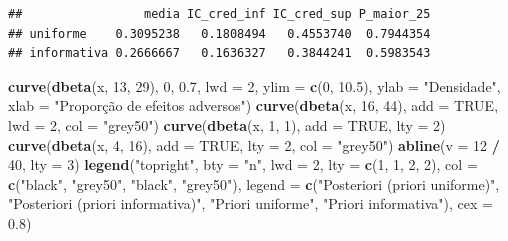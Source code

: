 \documentclass[
]{book}
\newenvironment{Shaded}{\begin{snugshade}}{\end{snugshade}}
\newcommand{\AttributeTok}[1]{\textcolor[rgb]{0.13,0.29,0.53}{#1}}
\newcommand{\ConstantTok}[1]{\textcolor[rgb]{0.56,0.35,0.01}{#1}}
\newcommand{\DecValTok}[1]{\textcolor[rgb]{0.00,0.00,0.81}{#1}}
\newcommand{\FloatTok}[1]{\textcolor[rgb]{0.00,0.00,0.81}{#1}}
\newcommand{\FunctionTok}[1]{\textcolor[rgb]{0.13,0.29,0.53}{\textbf{#1}}}
\newcommand{\NormalTok}[1]{#1}
\newcommand{\SpecialCharTok}[1]{\textcolor[rgb]{0.81,0.36,0.00}{\textbf{#1}}}
\newcommand{\StringTok}[1]{\textcolor[rgb]{0.31,0.60,0.02}{#1}}
\begin{document}
\begin{verbatim}
##                 media IC_cred_inf IC_cred_sup P_maior_25
## uniforme    0.3095238   0.1808494   0.4553740  0.7944354
## informativa 0.2666667   0.1636327   0.3844241  0.5983543
\end{verbatim}

\begin{Shaded}
\begin{Highlighting}[]
\FunctionTok{curve}\NormalTok{(}\FunctionTok{dbeta}\NormalTok{(x, }\DecValTok{13}\NormalTok{, }\DecValTok{29}\NormalTok{), }\DecValTok{0}\NormalTok{, }\FloatTok{0.7}\NormalTok{, }\AttributeTok{lwd =} \DecValTok{2}\NormalTok{, }\AttributeTok{ylim =} \FunctionTok{c}\NormalTok{(}\DecValTok{0}\NormalTok{, }\FloatTok{10.5}\NormalTok{), }\AttributeTok{ylab =} \StringTok{"Densidade"}\NormalTok{, }\AttributeTok{xlab =} \StringTok{"Proporção de efeitos adversos"}\NormalTok{)}
\FunctionTok{curve}\NormalTok{(}\FunctionTok{dbeta}\NormalTok{(x, }\DecValTok{16}\NormalTok{, }\DecValTok{44}\NormalTok{), }\AttributeTok{add =} \ConstantTok{TRUE}\NormalTok{, }\AttributeTok{lwd =} \DecValTok{2}\NormalTok{, }\AttributeTok{col =} \StringTok{"grey50"}\NormalTok{)}
\FunctionTok{curve}\NormalTok{(}\FunctionTok{dbeta}\NormalTok{(x, }\DecValTok{1}\NormalTok{, }\DecValTok{1}\NormalTok{), }\AttributeTok{add =} \ConstantTok{TRUE}\NormalTok{, }\AttributeTok{lty =} \DecValTok{2}\NormalTok{)}
\FunctionTok{curve}\NormalTok{(}\FunctionTok{dbeta}\NormalTok{(x, }\DecValTok{4}\NormalTok{, }\DecValTok{16}\NormalTok{), }\AttributeTok{add =} \ConstantTok{TRUE}\NormalTok{, }\AttributeTok{lty =} \DecValTok{2}\NormalTok{, }\AttributeTok{col =} \StringTok{"grey50"}\NormalTok{)}
\FunctionTok{abline}\NormalTok{(}\AttributeTok{v =} \DecValTok{12} \SpecialCharTok{/} \DecValTok{40}\NormalTok{, }\AttributeTok{lty =} \DecValTok{3}\NormalTok{)}
\FunctionTok{legend}\NormalTok{(}\StringTok{"topright"}\NormalTok{, }\AttributeTok{bty =} \StringTok{"n"}\NormalTok{, }\AttributeTok{lwd =} \DecValTok{2}\NormalTok{, }\AttributeTok{lty =} \FunctionTok{c}\NormalTok{(}\DecValTok{1}\NormalTok{, }\DecValTok{1}\NormalTok{, }\DecValTok{2}\NormalTok{, }\DecValTok{2}\NormalTok{), }\AttributeTok{col =} \FunctionTok{c}\NormalTok{(}\StringTok{"black"}\NormalTok{, }\StringTok{"grey50"}\NormalTok{, }\StringTok{"black"}\NormalTok{, }\StringTok{"grey50"}\NormalTok{),}
       \AttributeTok{legend =} \FunctionTok{c}\NormalTok{(}\StringTok{"Posteriori (priori uniforme)"}\NormalTok{, }\StringTok{"Posteriori (priori informativa)"}\NormalTok{,}
                  \StringTok{"Priori uniforme"}\NormalTok{, }\StringTok{"Priori informativa"}\NormalTok{), }\AttributeTok{cex =} \FloatTok{0.8}\NormalTok{)}
\end{Highlighting}
\end{Shaded}
\end{document}
